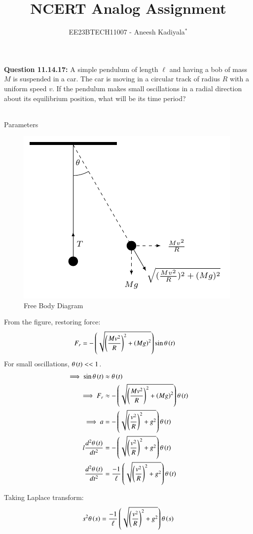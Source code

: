 \documentclass[journal,12pt,twocolumn]{IEEEtran}
\theoremstyle{remark}
\begin{document}

\vspace{3cm}

\title{NCERT Analog Assignment}
\author{EE23BTECH11007 - Aneesh Kadiyala$^{*}$%
}
\maketitle
\newpage
\bigskip

\renewcommand{\thefigure}{\theenumi}
\renewcommand{\thetable}{\theenumi}

\vspace{3cm}
\textbf{Question 11.14.17:} A simple pendulum of length $\ell$ and having a bob of mass $M$ is suspended in a car. The car is moving in a circular track of radius $R$ with a uniform speed $v$. If the pendulum makes small oscillations in a radial direction about its equilibrium position, what will be its time period?
\\
\solution
\\
\begin{table}[h!]
    \centering
    \caption{Parameters}
    \label{tab:1}
    
\end{table}
\begin{figure}[h!]
\centering
\includegraphics{figs/fbd.pdf}
\caption{Free Body Diagram}
\label{fig:1}
\end{figure}

From the figure, restoring force:
\begin{align}
F_r &= -\left(\sqrt{\left(\frac{Mv^2}{R}\right)^2+\left(Mg\right)^2}\right)\sin{\theta\ensuremath{\left(t\right)}}
\end{align}
For small oscillations, $\theta\left(t\right) << 1$.
\begin{align}
\implies \sin{\theta\ensuremath{\left(t\right)}} &\approx \theta\left(t\right) \\
\implies F_r &\approx -\left(\sqrt{\left(\frac{Mv^2}{R}\right)^2+\left(Mg\right)^2}\right)\theta\left(t\right) \\
\implies a &= -\left(\sqrt{\left(\frac{v^2}{R}\right)^2+g^2}\right)\theta\left(t\right) \\
l\frac{d^2\theta\left(t\right)}{dt^2} &= -\left(\sqrt{\left(\frac{v^2}{R}\right)^2+g^2}\right)\theta\left(t\right) \\
\frac{d^2\theta\left(t\right)}{dt^2} &= \frac{-1}{\ell}\left(\sqrt{\left(\frac{v^2}{R}\right)^2+g^2}\right)\theta\left(t\right) \\
\end{align}

Taking Laplace transform:
\begin{align}
s^2\theta\left(s\right) &= \frac{-1}{\ell}\left(\sqrt{\left(\frac{v^2}{R}\right)^2+g^2}\right)\theta\left(s\right) \\
\end{align}
\end{document}
